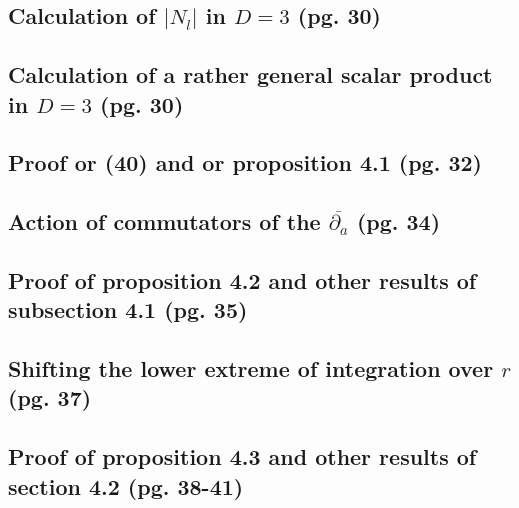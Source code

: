 \documentclass{article}
\begin{document}
\subsection{Calculation of $|N_l|$ in $D = 3$ (pg. 30)}

\subsection{Calculation of a rather general scalar product in $D = 3$ (pg. 30)}

\subsection{Proof or (40) and or proposition 4.1 (pg. 32)}

\subsection{Action of commutators of the $\overline{\partial_a}$ (pg. 34)}

\subsection{Proof of proposition 4.2 and other results of subsection 4.1 (pg. 35)}

\subsection{Shifting the lower extreme of integration over $r$ (pg. 37)}

\subsection{Proof of proposition 4.3 and other results of section 4.2 (pg. 38-41)}
\end{document}
